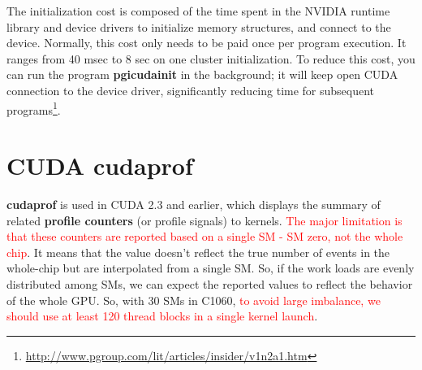 \begin{framed}
  The initialization cost is composed of the time spent in the
  NVIDIA runtime library and device drivers to initialize memory
  structures, and connect to the device. Normally, this cost only needs
  to be paid once per program execution. It ranges from 40 msec to 8 sec
  on one cluster initialization. To reduce this cost, you can run the
  program {\bf pgicudainit} in the background; it will keep open CUDA
  connection to the device driver, significantly reducing time for
  subsequent
  programs\footnote{\url{http://www.pgroup.com/lit/articles/insider/v1n2a1.htm}}. 
\end{framed}
\section{CUDA {\bf cudaprof}}
\label{sec:cuda-cudaprof}


{\bf cudaprof} is used in CUDA 2.3 and earlier, which displays the
summary of related {\bf profile counters} (or profile signals) to
kernels.
\textcolor{red}{The major limitation is that these counters are
  reported based on a single SM - SM zero, not the whole chip}.
It means that the value doesn't reflect the true number of events in
the whole-chip but are interpolated from a single SM.  So, if the work
loads are evenly distributed among SMs, we can expect the reported
values to reflect the behavior of the whole GPU. So, with 30 SMs in
C1060,
\textcolor{red}{to avoid large imbalance, we should use at least 120
  thread blocks in a single kernel launch}.

